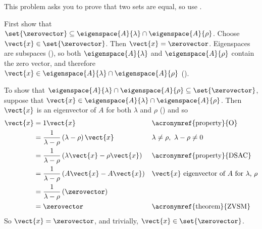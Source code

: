 This problem asks you to prove that two sets are equal, so use .\par
%
First show that $\set{\zerovector}\subseteq\eigenspace{A}{\lambda}\cap\eigenspace{A}{\rho}$.  Choose $\vect{x}\in\set{\zerovector}$.  Then $\vect{x}=\zerovector$.   Eigenspaces are subspaces (), so both $\eigenspace{A}{\lambda}$ and $\eigenspace{A}{\rho}$ contain the zero vector, and therefore $\vect{x}\in\eigenspace{A}{\lambda}\cap\eigenspace{A}{\rho}$ ().\par
%
To show that $\eigenspace{A}{\lambda}\cap\eigenspace{A}{\rho}\subseteq\set{\zerovector}$, suppose that $\vect{x}\in\eigenspace{A}{\lambda}\cap\eigenspace{A}{\rho}$.  Then $\vect{x}$ is an eigenvector of $A$ for both $\lambda$ and $\rho$ () and so
%
\begin{align*}
\vect{x}
&=1\vect{x}
&&\text{\acronymref{property}{O}}\\
%
&=\frac{1}{\lambda-\rho}\left(\lambda-\rho\right)\vect{x}
&&\lambda\neq\rho,\ \lambda-\rho\neq 0\\
%
&=\frac{1}{\lambda-\rho}\left(\lambda\vect{x}-\rho\vect{x}\right)
&&\text{\acronymref{property}{DSAC}}\\
%
&=\frac{1}{\lambda-\rho}\left(A\vect{x}-A\vect{x}\right)
&&\text{$\vect{x}$ eigenvector of $A$ for $\lambda$, $\rho$}\\
%
&=\frac{1}{\lambda-\rho}\left(\zerovector\right)\\
%
&=\zerovector
&&\text{\acronymref{theorem}{ZVSM}}\\
%
\end{align*}
%
So $\vect{x}=\zerovector$, and trivially, $\vect{x}\in\set{\zerovector}$.